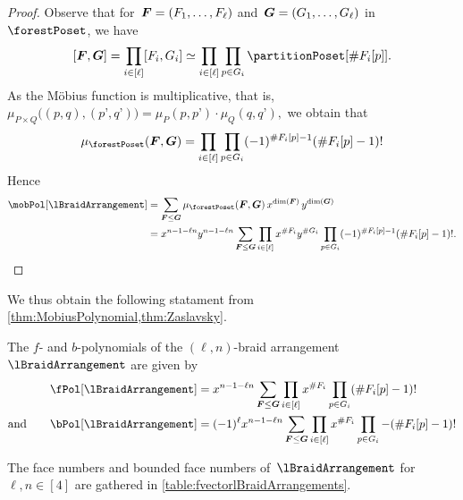 \begin{proof}
Observe that for~$\boldsymbol{F} = (F_1, \dots, F_\ell)$ and~$\boldsymbol{G} = (G_1, \dots, G_\ell)$ in~$\forestPoset$, we have
\[
[\b{F}, \b{G}] = \prod_{i \in [\ell]} [F_i, G_i] \simeq \prod_{i \in [\ell]} \prod_{p \in G_i} \partitionPoset[{\#F_i[p]}].
\]
As the M\"obius function is multiplicative, that is,
\(
\mu_{P \times Q} \big( (p,q), (p’,q’) \big) = \mu_P(p,p’) \cdot \mu_Q(q,q’),
\)
we obtain that
\[
\mu_{\forestPoset}(\b{F}, \b{G}) = \prod_{i \in [\ell]} \prod_{p \in G_i} (-1)^{\#F_i[p]-1} (\# F_i[p]-1)!
\]
Hence
\begin{align*}
\mobPol[\lBraidArrangement] 
& = \sum_{\b{F} \le \b{G}} \mu_{\forestPoset}(\b{F}, \b{G}) \, x^{\dim(\b{F})} \, y^{\dim(\b{G})} \\
& = x^{n-1-\ell n} y^{n-1-\ell n} \sum_{\b{F} \le \b{G}} \prod_{i \in [\ell]} x^{\#F_i} y^{\#G_i} \prod_{p \in G_i} (-1)^{\#F_i[p]-1} (\# F_i[p]-1)!.
\qedhere
\end{align*}
\end{proof}

We thus obtain the following statament from \cref{thm:MobiusPolynomial,thm:Zaslavsky}.

\begin{corollary}
\label{coro:fbvectorslBraidArrangement}
The $f$- and $b$-polynomials of the $(\ell,n)$-braid arrangement~$\lBraidArrangement$ are given by
\begin{align*}
\fPol[\lBraidArrangement] & = x^{n-1-\ell n}\sum_{\b{F} \le \b{G}} \prod_{i \in [\ell]} x^{\#F_i} \prod_{p \in G_i} (\# F_i[p]-1)!\\
\text{and}\qquad
\bPol[\lBraidArrangement] & = (-1)^\ell x^{n-1-\ell n} \sum_{\b{F} \le \b{G}} \prod_{i \in [\ell]} x^{\#F_i} \prod_{p \in G_i} -(\# F_i[p]-1)!
\end{align*}
\end{corollary}

The face numbers and bounded face numbers of~$\lBraidArrangement$ for~$\ell, n \in [4]$ are gathered in \cref{table:fvectorlBraidArrangements}.

